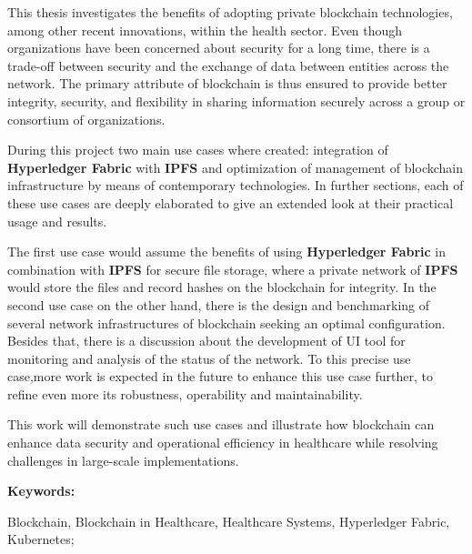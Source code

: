 This thesis investigates the benefits of adopting private blockchain technologies, 
among other recent innovations, within the health sector. Even though organizations 
have been concerned about security for a long time, there is a trade-off between security 
and the exchange of data between entities across the network. The primary attribute of blockchain 
is thus ensured to provide better integrity, security, and flexibility in sharing information securely 
across a group or consortium of organizations.

During this project two main use cases where created: integration of 
\textbf{Hyperledger Fabric} with \textbf{IPFS}  and optimization of management of blockchain 
infrastructure by means of contemporary technologies. In further sections, each of these use cases 
are deeply elaborated to give an extended look at their practical usage and results. 

The first use case would assume the benefits of using \textbf{Hyperledger Fabric} 
in combination with \textbf{IPFS} for secure file storage, where a private network of \textbf{IPFS} 
would store the files and record hashes on the blockchain for integrity. In the second use case on the other hand, 
there is the design and benchmarking of several network infrastructures of blockchain seeking an optimal 
configuration. Besides that, there is a discussion about the development of UI tool for monitoring and analysis 
of the status of the network. To this precise use case,more work is expected in the future to enhance this use 
case further, to refine even more its robustness, operability and maintainability.

This work will demonstrate such use cases and illustrate how blockchain can enhance data security 
and operational efficiency in healthcare while resolving challenges in large-scale implementations.

\vspace{1cm} %
\textbf{Keywords:} \parbox[t]{0.6\textwidth}{\raggedright Blockchain, Blockchain in Healthcare, Healthcare Systems, Hyperledger Fabric, Kubernetes;}
\medskip

\pagebreak